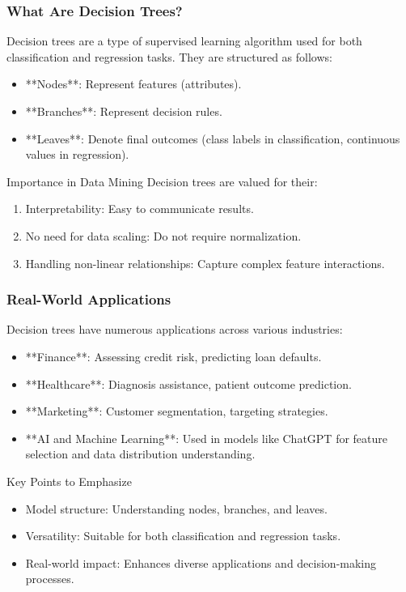 \documentclass[aspectratio=169]{beamer}
\begin{document}
\begin{frame}[fragile]
    \frametitle{What Are Decision Trees?}
    Decision trees are a type of supervised learning algorithm used for both classification and regression tasks. They are structured as follows:
    
    \begin{itemize}
        \item **Nodes**: Represent features (attributes).
        \item **Branches**: Represent decision rules.
        \item **Leaves**: Denote final outcomes (class labels in classification, continuous values in regression).
    \end{itemize}

    \begin{block}{Importance in Data Mining}
        Decision trees are valued for their:
        \begin{enumerate}
            \item Interpretability: Easy to communicate results.
            \item No need for data scaling: Do not require normalization.
            \item Handling non-linear relationships: Capture complex feature interactions.
        \end{enumerate}
    \end{block}
\end{frame}

\begin{frame}[fragile]
    \frametitle{Real-World Applications}
    Decision trees have numerous applications across various industries:
    
    \begin{itemize}
        \item **Finance**: Assessing credit risk, predicting loan defaults.
        \item **Healthcare**: Diagnosis assistance, patient outcome prediction.
        \item **Marketing**: Customer segmentation, targeting strategies.
        \item **AI and Machine Learning**: Used in models like ChatGPT for feature selection and data distribution understanding.
    \end{itemize}

    \begin{block}{Key Points to Emphasize}
        \begin{itemize}
            \item Model structure: Understanding nodes, branches, and leaves.
            \item Versatility: Suitable for both classification and regression tasks.
            \item Real-world impact: Enhances diverse applications and decision-making processes.
        \end{itemize}
    \end{block}
\end{frame}
\end{document}
